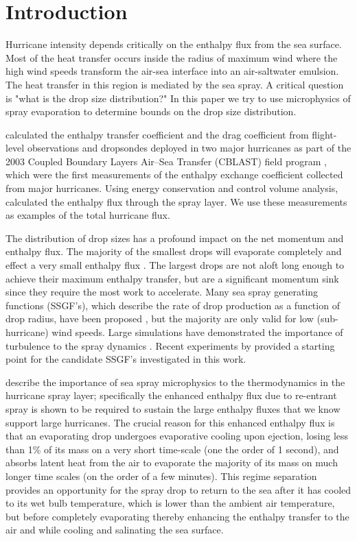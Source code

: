 \documentclass[10pt,a4paper]{article}
\begin{document}
\section{Introduction}
Hurricane intensity depends critically on the enthalpy flux from the sea surface. Most of the heat transfer occurs inside the radius of maximum wind where the high wind speeds transform the air-sea interface into an air-saltwater emulsion. The heat transfer in this region is mediated by the sea spray. A critical question is "what is the drop size distribution?" In this paper we try to use microphysics of spray evaporation to determine bounds on the drop size distribution.\par
\citet{Bell2012} calculated the enthalpy transfer coefficient and the drag coefficient from flight-level observations and dropsondes deployed in two major hurricanes as part of the 2003 Coupled Boundary Layers Air–Sea Transfer (CBLAST) field program \citep{Black2007}, which were the first measurements of the enthalpy exchange coefficient collected from major hurricanes. Using energy conservation and control volume analysis, \citet{Bell2012} calculated the enthalpy flux through the spray layer. We use these measurements as examples of the total hurricane flux.\par
The distribution of drop sizes has a profound impact on the net momentum and enthalpy flux. The majority of the smallest drops will evaporate completely and effect a very small enthalpy flux \citep{Andreas2001}. The largest drops are not aloft long enough to achieve their maximum enthalpy transfer, but are a significant momentum sink since they require the most work to accelerate. Many sea spray generating functions (SSGF's), which describe the rate of drop production as a function of drop radius, have been proposed \citep{Fairall1996}, but the majority are only valid for low (sub-hurricane) wind speeds. Large simulations have demonstrated the importance of turbulence to the spray dynamics \citep{Shpund2011,Shpund2012,Shpund2014}. Recent experiments by \citet{Ortiz-Suslow2016} provided a starting point for the candidate SSGF's investigated in this work.\par
 \citet{Andreas2001} describe the importance of sea spray microphysics to the thermodynamics in the hurricane spray layer; specifically the enhanced enthalpy flux due to re-entrant spray is shown to be required to sustain the large enthalpy fluxes that we know support large hurricanes. The crucial reason for this enhanced enthalpy flux is that an evaporating drop undergoes evaporative cooling upon ejection, losing less than 1\% of its mass on a very short time-scale (one the order of 1 second), and absorbs latent heat from the air to evaporate the majority of its mass on much longer time scales (on the order of a few minutes). This regime separation provides an opportunity for the spray drop to return to the sea after it has cooled to its wet bulb temperature, which is lower than the ambient air temperature, but before completely evaporating thereby enhancing the enthalpy transfer to the air and while cooling and salinating the sea surface. \par 
\end{document}
